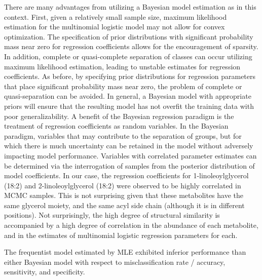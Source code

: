 \begin{DoubleSpace*}
There are many advantages from utilizing a Bayesian model estimation as in this context. First, given a relatively small sample size, maximum likelihood estimation for the multinomial logistic model may not allow for convex optimization. The specification of prior distributions with significant probability mass near zero for regression coefficients allows for the encouragement of sparsity. In addition, complete or quasi-complete separation of classes can occur utilizing maximum likelihood estimation, leading to unstable estimates for regression coefficients. As before, by specifying prior distributions for regression parameters that place significant probability mass near zero, the problem of complete or quasi-separation can be avoided. In general, a Bayesian model with appropriate priors will ensure that the resulting model has not overfit the training data with poor generalizability. A benefit of the Bayesian regression paradigm is the treatment of regression coefficients as random variables. In the Bayesian paradigm, variables that may contribute to the separation of groups, but for which there is much uncertainty can be retained in the model without adversely impacting model performance. Variables with correlated parameter estimates can be determined via the interrogation of samples from the posterior distribution of model coefficients. In our case, the regression coefficients for 1-linoleoylglycerol (18:2) and 2-linoleoylglycerol (18:2) were observed to be highly correlated in MCMC samples. This is not surprising given that these metabolites have the same glycerol moiety, and the same acyl side chain (although it is in different positions). Not surprisingly, the high degree of structural similarity is accompanied by a high degree of correlation in the abundance of each metabolite, and in the estimates of multinomial logistic regression parameters for each.

The frequentist model estimated by MLE exhibited inferior performance than either Bayesian model with respect to misclassification rate / accuracy, sensitivity, and specificity. 

\end{DoubleSpace*}